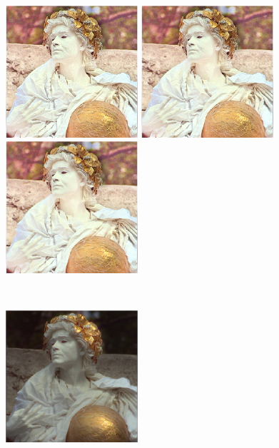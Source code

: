 \begin{figure}[tb]
\centering
	\begin{minipage}[b]{0.32\hsize}
	\centering
	\includegraphics[width=49mm, height = 49mm]{images/norm_p/reflectance/p06.eps}
	\end{minipage}
	\begin{minipage}[b]{0.32\hsize}
	\centering
	\includegraphics[width=49mm, height = 49mm]{images/norm_p/reflectance/p10.eps}
	\end{minipage}
	\begin{minipage}[b]{0.32\hsize}
	\centering
	\includegraphics[width=49mm, height = 49mm]{images/norm_p/reflectance/p20.eps}
	\end{minipage}\\
	\vspace{1.5mm}
	\begin{minipage}[b]{0.32\hsize}
	\centering
	\includegraphics[width=49mm, height = 49mm]{images/norm_p/illumination/p06.eps}

\end{minipage}
\end{figure}
